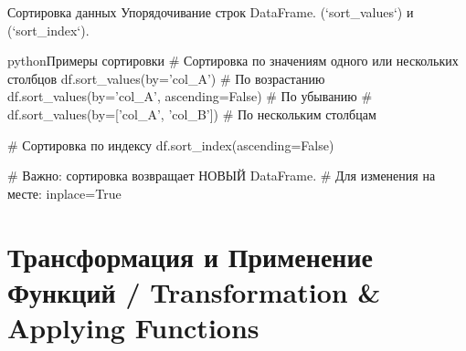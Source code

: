 \begin{textbox}{Сортировка данных}
Упорядочивание строк DataFrame.
 (`sort\_values`) и  (`sort\_index`).

\begin{codebox}{python}{Примеры сортировки}
# Сортировка по значениям одного или нескольких столбцов
df.sort_values(by='col_A') # По возрастанию
df.sort_values(by='col_A', ascending=False) # По убыванию
# df.sort_values(by=['col_A', 'col_B']) # По нескольким столбцам

# Сортировка по индексу
df.sort_index(ascending=False)

# Важно: сортировка возвращает НОВЫЙ DataFrame.
# Для изменения на месте: inplace=True
\end{codebox}
\end{textbox}

\section{Трансформация и Применение Функций / Transformation \& Applying Functions}

